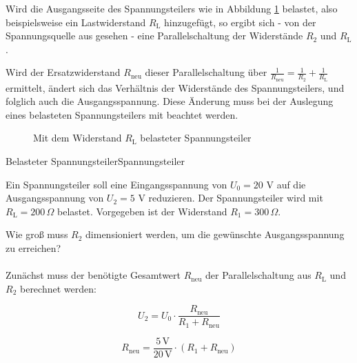 \begin{frame}
{		Wird die Ausgangsseite des Spannungsteilers wie in Abbildung \ref{fig:belspannungsteiler} belastet, also beispielsweise ein Lastwiderstand $R_\mathrm{L}$ hinzugefügt,
		so ergibt sich - von der Spannungsquelle aus gesehen - eine Parallelschaltung der Widerstände $R_2$ und $R_\mathrm{L}$.
		
		Wird der Ersatzwiderstand $R_\mathrm{neu}$ dieser Parallelschaltung über 
		$\frac{1}{R_\mathrm{neu}} = \frac{1}{R_2} + \frac{1}{R_\mathrm{L}}$ ermittelt, ändert sich das Verhältnis der Widerstände des Spannungsteilers, 
		und folglich auch die Ausgangsspannung. Diese Änderung muss bei der Auslegung eines belasteten Spannungsteilers mit beachtet werden.
		
		
		
		
		\begin{figure}[h!]
			\begin{center}

				
				\caption{Mit dem Widerstand $R_\mathrm{L}$ belasteter Spannungsteiler}
				\label{fig:belspannungsteiler}
			\end{center}
		\end{figure}
		
		
		
		
		
		\begin{bsp}{Belasteter Spannungsteiler}{Spannungsteiler}
			
			Ein Spannungsteiler soll eine Eingangsspannung von $U_0 = 20$ V auf die Ausgangsspannung von $U_2 = 5$ V reduzieren. 
			Der Spannungsteiler wird mit $R_\mathrm{L} = 200 \, \Omega$ belastet.
			Vorgegeben ist der Widerstand $R_1 = 300 \, \Omega$.
			
			Wie groß muss $R_2$ dimensioniert werden, um die gewünschte Ausgangsspannung zu erreichen?\\
			
			\phantom{.}\\
			
			
			Zunächst muss der benötigte Gesamtwert $R_\mathrm{neu}$ der Parallelschaltung aus $R_\mathrm{L}$ und $R_2$ berechnet werden:
			
			\begin{equation*}
				U_2 = U_0 \cdot \frac{R_\mathrm{neu}}{R_1+R_\mathrm{neu}}
			\end{equation*}
			
			\begin{equation*}
				R_\mathrm{neu} = \frac{5 \, \mathrm{V}}{20 \, \mathrm{V}} \cdot (R_1 + R_\mathrm{neu})
			\end{equation*}
			

\end{bsp}}
\end{frame}
